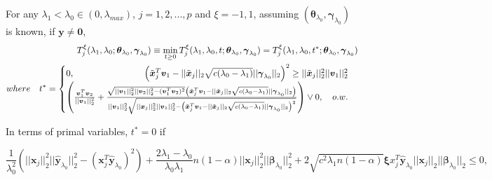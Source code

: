 \begin{theorem}
    \label{thm:2.2}
    For any $\lambda_1<\lambda_{0}\in (0,\lambda_{max})$, $j=1,2,...,p$ and $\xi=-1,1$, assuming $(\boldsymbol\theta_{\lambda_0},\boldsymbol\gamma_{\lambda_0})$ is known, if $\boldsymbol y\neq \boldsymbol 0$,
    \begin{gather}
        \begin{aligned}
            T^\xi_j(\lambda_1,\lambda_0;\boldsymbol\theta_{\lambda_0},\boldsymbol\gamma_{\lambda_0})\equiv\underset{t\geq 0}{\mathrm{min}}\,T^\xi_j(\lambda_1,\lambda_0,t;\boldsymbol\theta_{\lambda_0},\boldsymbol\gamma_{\lambda_0})=T^\xi_j(\lambda_1,\lambda_0,t^*;\boldsymbol\theta_{\lambda_0},\boldsymbol\gamma_{\lambda_0})\\
            where\quad t^*=\begin{cases}
            0,\hfill \left(\tilde{\boldsymbol x}_j^T\boldsymbol v_1-||\tilde{\boldsymbol x}_j||_2\sqrt{c(\lambda_0-\lambda_1)}||\boldsymbol\gamma_{\lambda_0}||_2\right)^2\geq ||\tilde{\boldsymbol x}_j||^2_2||\boldsymbol v_1||^2_2\\
            \left(\frac{\boldsymbol v_1^T\boldsymbol v_2}{||\boldsymbol v_1||_2^2}+\frac{\sqrt{||\boldsymbol v_1||_2^2||\boldsymbol v_2||_2^2-(\boldsymbol v_1^T\boldsymbol v_2)^2}\left(\tilde{\boldsymbol x}_j^T\boldsymbol v_1-||\tilde{\boldsymbol x}_j||_2\sqrt{c(\lambda_0-\lambda_1)}||\boldsymbol\gamma_{\lambda_0}||_2\right)}{||\boldsymbol v_1||_2^2\sqrt{||\boldsymbol x_j||_2^2||\boldsymbol v_1||_2^2-\left(\tilde{\boldsymbol x}_j^T\boldsymbol v_1-||\tilde{\boldsymbol x}_j||_2\sqrt{c(\lambda_0-\lambda_1)}||\boldsymbol\gamma_{\lambda_0}||_2\right)^2}}\right)\vee 0,\hfill\quad o.w.
            \end{cases}
        \end{aligned}
    \end{gather}
\end{theorem}

In terms of primal variables, $t^*=0$ if

\begin{equation}
    \frac{1}{\lambda_0^2}\left(||\boldsymbol x_j||_2^2||\hat{\boldsymbol y}_{\lambda_0}||_2^2-(\boldsymbol x_j^T\hat{\boldsymbol y}_{\lambda_0})^2\right)+\frac{2\lambda_1-\lambda_0}{\lambda_0\lambda_1}n(1-\alpha)||\boldsymbol x_j||_2^2||\boldsymbol\beta_{\lambda_0}||_2^2+2\sqrt{c^2\lambda_1n(1-\alpha)}\boldsymbol \xi x_j^T\hat{\boldsymbol y}_{\lambda_0}||\boldsymbol x_j||_2||\boldsymbol\beta_{\lambda_0}||_2\leq 0,
\end{equation}

